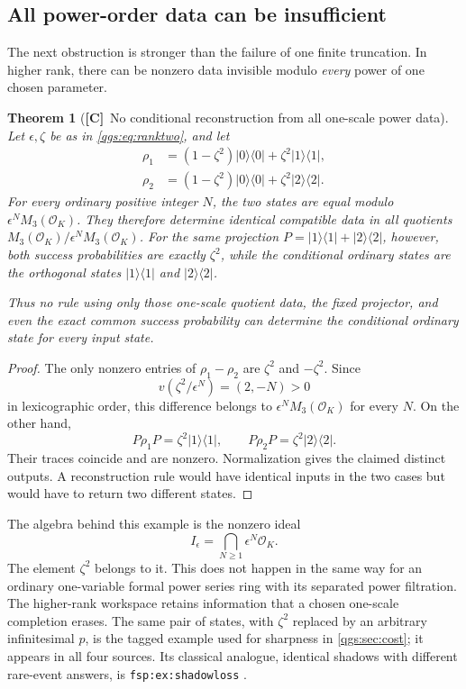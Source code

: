 \documentclass[11pt,oneside]{article}
\numberwithin{equation}{section}
\theoremstyle{plain}
\newtheorem{theorem}{Theorem}[section]
\theoremstyle{definition}
\theoremstyle{remark}
\newcommand{\OO}{\mathcal O}
\newcommand{\ket}[1]{\lvert#1\rangle}
\newcommand{\bra}[1]{\langle#1\rvert}
\newcommand{\proj}[1]{\ket{#1}\!\bra{#1}}
\newcommand{\TC}{\textcolor{TierC}{\textsf{\bfseries[C]}}}
\begin{document}
\subsection{All power-order data can be insufficient}
The next obstruction is stronger than the failure of one finite truncation. In higher rank, there can be nonzero data invisible modulo \emph{every} power of one chosen parameter.

\begin{theorem}[\TC\ No conditional reconstruction from all one-scale power data]\label{qgs:thm:alljets}
Let $\epsilon,\zeta$ be as in \eqref{qgs:eq:ranktwo}, and let
\begin{align*}
 \rho_1&=(1-\zeta^2)\proj{0}+\zeta^2\proj{1},\\
 \rho_2&=(1-\zeta^2)\proj{0}+\zeta^2\proj{2}.
\end{align*}
For every ordinary positive integer $N$, the two states are equal modulo $\epsilon^N M_3(\OO_K)$. They therefore determine identical compatible data in all quotients $M_3(\OO_K)/\epsilon^N M_3(\OO_K)$. For the same projection $P=\proj{1}+\proj{2}$, however, both success probabilities are exactly $\zeta^2$, while the conditional ordinary states are the orthogonal states $\proj{1}$ and $\proj{2}$.

Thus no rule using only those one-scale quotient data, the fixed projector, and even the exact common success probability can determine the conditional ordinary state for every input state.
\end{theorem}
\begin{proof}
The only nonzero entries of $\rho_1-\rho_2$ are $\zeta^2$ and $-\zeta^2$. Since
\[
 v(\zeta^2/\epsilon^N)=(2,-N)>0
\]
in lexicographic order, this difference belongs to $\epsilon^N M_3(\OO_K)$ for every $N$. On the other hand,
\[
 P\rho_1P=\zeta^2\proj{1},\qquad
 P\rho_2P=\zeta^2\proj{2}.
\]
Their traces coincide and are nonzero. Normalization gives the claimed distinct outputs. A reconstruction rule would have identical inputs in the two cases but would have to return two different states.
\end{proof}

The algebra behind this example is the nonzero ideal
\begin{equation}
 I_\epsilon=\bigcap_{N\ge1}\epsilon^N\OO_K.
\end{equation}
The element $\zeta^2$ belongs to it. This does not happen in the same way for an ordinary one-variable formal power series ring with its separated power filtration. The higher-rank workspace retains information that a chosen one-scale completion erases. The same pair of states, with $\zeta^2$ replaced by an arbitrary infinitesimal $p$, is the tagged example used for sharpness in \cref{qgs:sec:cost}; it appears in all four sources. Its classical analogue, identical shadows with different rare-event answers, is \texttt{fsp:ex:shadowloss} \cite{repoProbability}.
\end{document}
